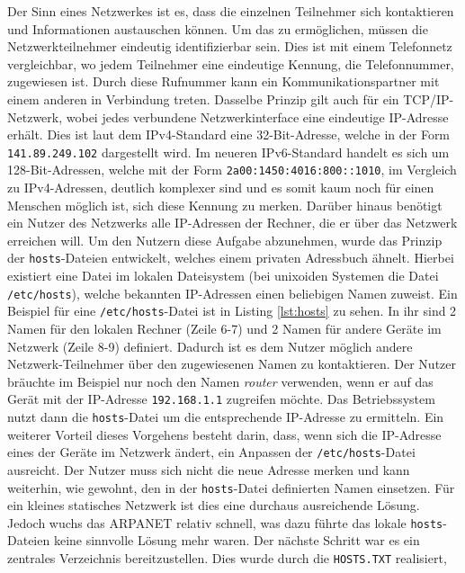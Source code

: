 \documentclass[a4paper, 12pt, BCOR10mm, DIV12, toc=bibliography, toc=listof, german]{scrbook}
\begin{document}
			Der Sinn eines Netzwerkes ist es, dass die einzelnen Teilnehmer sich kontaktieren und
			Informationen austauschen können. Um das zu ermöglichen, müssen die Netzwerkteilnehmer
			eindeutig identifizierbar sein. Dies ist mit einem Telefonnetz vergleichbar, wo jedem
			Teilnehmer eine eindeutige Kennung, die Telefonnummer, zugewiesen ist. Durch diese Rufnummer
			kann ein Kommunikationspartner mit einem anderen in Verbindung treten. Dasselbe Prinzip gilt
			auch für ein TCP/IP-Netzwerk, wobei jedes verbundene Netzwerkinterface eine eindeutige
			IP-Adresse erhält. Dies ist laut dem IPv4-Standard \cite{rfc791} eine 32-Bit-Adresse, welche
			in der Form \texttt{141.89.249.102} dargestellt wird. Im neueren IPv6-Standard \cite{rfc2460}
			handelt es sich um 128-Bit-Adressen, welche mit der Form \texttt{2a00:1450:4016:800::1010}, im
			Vergleich zu IPv4-Adressen, deutlich komplexer sind und es somit kaum noch für einen Menschen
			möglich ist, sich diese Kennung zu merken. Darüber hinaus benötigt ein Nutzer des Netzwerks
			alle IP-Adressen der Rechner, die er über das Netzwerk erreichen will. Um den Nutzern diese
			Aufgabe abzunehmen, wurde das Prinzip der \texttt{hosts}-Dateien entwickelt, welches einem
			privaten Adressbuch ähnelt. Hierbei existiert eine Datei im lokalen Dateisystem (bei unixoiden
			Systemen die Datei \texttt{/etc/hosts}), welche bekannten IP-Adressen einen beliebigen Namen
			zuweist. Ein Beispiel für eine \texttt{/etc/hosts}-Datei ist in Listing \ref{lst:hosts} zu
			sehen. In ihr sind 2 Namen für den lokalen Rechner (Zeile 6-7) und 2 Namen für andere Geräte
			im Netzwerk (Zeile 8-9) definiert. Dadurch ist es dem Nutzer möglich andere
			Netzwerk-Teilnehmer über den zugewiesenen Namen zu kontaktieren. Der Nutzer bräuchte im
			Beispiel nur noch den Namen \textit{router} verwenden, wenn er auf das Gerät mit der
			IP-Adresse \texttt{192.168.1.1} zugreifen möchte. Das Betriebssystem nutzt dann die
			\texttt{hosts}-Datei um die entsprechende IP-Adresse zu ermitteln. Ein weiterer Vorteil dieses
			Vorgehens besteht darin, dass, wenn sich die IP-Adresse eines der Geräte im Netzwerk ändert,
			ein Anpassen der \texttt{/etc/hosts}-Datei ausreicht. Der Nutzer muss sich nicht die neue
			Adresse merken und kann weiterhin, wie gewohnt, den in der \texttt{hosts}-Datei definierten
			Namen einsetzen. Für ein kleines statisches Netzwerk ist dies eine durchaus ausreichende
			Lösung. Jedoch wuchs das ARPANET relativ schnell, was dazu führte das lokale
			\texttt{hosts}-Dateien keine sinnvolle Lösung mehr waren. Der nächste Schritt war es ein
			zentrales Verzeichnis bereitzustellen. Dies wurde durch die \texttt{HOSTS.TXT} realisiert,
\end{document}
